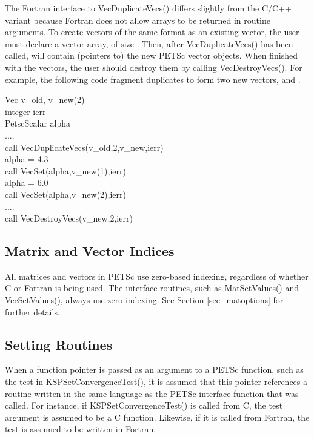 The Fortran interface to VecDuplicateVecs() differs slightly
from the C/C++ variant because Fortran does not allow arrays to be
returned in routine arguments.  To create  vectors of the same
format as an existing vector, the user must declare a vector array,
 of size .  Then, after VecDuplicateVecs() has
been called,  will contain (pointers to) the new PETSc
vector objects.  When finished with the vectors, the user should
destroy them by calling VecDestroyVecs().
 For example, the following code fragment
duplicates  to form two new vectors,  and .
\begin{tabbing}
   Vec     v\_old, v\_new(2)\\
   integer ierr\\
   PetscScalar  alpha\\
   ....\\
   call VecDuplicateVecs(v\_old,2,v\_new,ierr)\\
   alpha = 4.3\\
   call VecSet(alpha,v\_new(1),ierr)\\
   alpha = 6.0\\
   call VecSet(alpha,v\_new(2),ierr)\\
   ....\\
   call VecDestroyVecs(v\_new,2,ierr)
\end{tabbing}

\subsection{Matrix and Vector Indices}

All matrices and vectors in PETSc use zero-based indexing, regardless
of whether C or Fortran is being used.  The interface routines, such
as MatSetValues() and VecSetValues(), always use zero
indexing.  See Section \ref{sec_matoptions} for further details.

\subsection{Setting Routines}

When a function pointer is passed as an argument to a PETSc function, such as
the test in KSPSetConvergenceTest(), it is assumed that this pointer references
a routine written in the same language as the PETSc interface function that was
called. For instance, if KSPSetConvergenceTest() is called from C, the test
argument is assumed to be a C function. Likewise, if it is called from Fortran,
the test is assumed to be written in Fortran.


